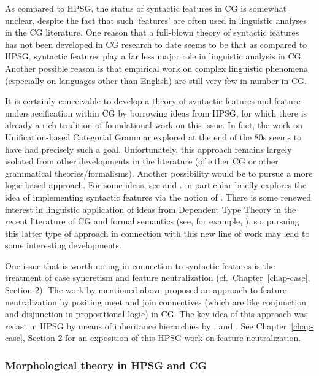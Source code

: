 \documentclass[output=paper]{langsci/langscibook}
\begin{document}
As compared to HPSG, the status of syntactic features in CG is
somewhat unclear, despite the fact that such `features' are often used
in linguistic analyses in the CG literature. One reason that a
full-blown theory of syntactic features has not been developed in CG
research to date seems to be that as compared to HPSG, syntactic
features play a far less major role in linguistic analysis in CG.
Another possible reason is that empirical work on complex linguistic
phenomena (especially on languages other than English) are still very
few in number in CG. 

It is certainly conceivable to develop a theory of syntactic features
and feature underspecification within CG by borrowing ideas from HPSG,
for which there is already a rich tradition of foundational work on this
issue. In fact, the work on Unification-based Categorial Grammar
\citep{CalderEA1988} explored at the end of the 80s seems to have had
precisely such a goal. Unfortunately, this approach remains largely
isolated from other developments in the literature (of either CG or
other grammatical theories/formalisms). Another possibility would be to pursue a
more logic-based approach. For some ideas, see {\citet{BJ95,Bayer96}}
and \citet{Morrill94a-u}. \citet{Morrill94a-u} in particular briefly
explores the idea of implementing syntactic features via the notion of
. There is some renewed interest in
linguistic application of ideas from Dependent
Type Theory \citep{MartinLofIntuitionistic} in the recent literature
of CG and formal semantics (see, for example,
\citet{ChatzikyriakidisLuo2017}), so, pursuing this latter type of
approach in connection with this new line of work may lead to some
interesting developments.

One issue that is worth noting in connection to syntactic features is
the treatment of case syncretism and feature neutralization
(cf.~Chapter~\ref{chap-case}, Section 2). The work by
\citet{Morrill94a-u,Bayer96,BJ95} mentioned above proposed an approach
to feature neutralization by positing meet and join connectives (which
are like conjunction and disjunction in propositional logic) in CG.
The key idea of this approach was recast in HPSG by means of
inheritance hierarchies by \citet{levy:01}, \citet{lev:pol:01} and
\citet{dani:01}. See Chapter~\ref{chap-case}, Section 2 for an
exposition of this HPSG work on feature neutralization.



\subsubsection{Morphological theory in HPSG and CG}
\end{document}
